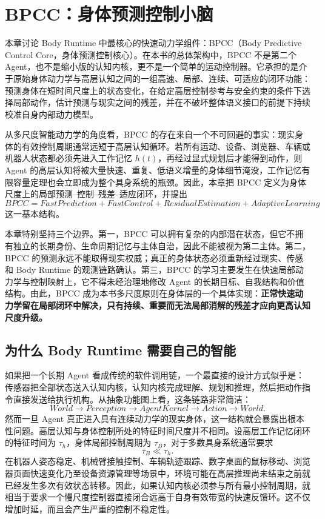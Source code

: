 \chapter{BPCC：身体预测控制小脑}

\begin{chapterlead}
本章讨论 Body Runtime 中最核心的快速动力学组件：BPCC（Body Predictive Control Core，身体预测控制核心）。在本书的总体架构中，BPCC 不是第二个 Agent，也不是缩小版的认知内核，更不是一个简单的运动控制器。它承担的是介于原始身体动力学与高层认知之间的一组高速、局部、连续、可适应的闭环功能：预测身体在短时间尺度上的状态变化，在给定高层控制参考与安全约束的条件下选择局部动作，估计预测与现实之间的残差，并在不破坏整体语义接口的前提下持续校准自身内部动力模型。

从多尺度智能动力学的角度看，BPCC 的存在来自一个不可回避的事实：现实身体的有效控制周期通常远短于高层认知循环。若所有运动、设备、浏览器、车辆或机器人状态都必须先进入工作记忆 $h(t)$，再经过显式规划后才能得到动作，则 Agent 的高层认知将被大量快速、重复、低语义增量的身体细节淹没，工作记忆有限容量定理也会立即成为整个具身系统的瓶颈。因此，本章把 BPCC 定义为身体尺度上的局部预测--控制--残差--适应闭环，并提出
\[
\boxed{
BPCC
=
FastPrediction
+
FastControl
+
ResidualEstimation
+
AdaptiveLearning
}
\]
这一基本结构。

本章特别坚持三个边界。第一，BPCC 可以拥有复杂的内部潜在状态，但它不拥有独立的长期身份、生命周期记忆与主体自治，因此不能被视为第二主体。第二，BPCC 的预测永远不能取得现实权威；真正的身体状态必须重新经过现实、传感和 Body Runtime 的观测链路确认。第三，BPCC 的学习主要发生在快速局部动力学与控制映射上，它不得未经治理地修改 Agent 的长期目标、自我结构和价值结构。由此，BPCC 成为本书多尺度原则在身体层的一个具体实现：\textbf{正常快速动力学留在局部闭环中解决，只有持续、重要而无法局部消解的残差才应向更高认知尺度升级。}
\end{chapterlead}


\section{为什么 Body Runtime 需要自己的智能}

如果把一个长期 Agent 看成传统的软件调用链，一个最直接的设计方式似乎是：传感器把全部状态送入认知内核，认知内核完成理解、规划和推理，然后把动作指令直接发送给执行机构。从抽象功能图上看，这条链路非常简洁：
\[
World
\rightarrow
Perception
\rightarrow
AgentKernel
\rightarrow
Action
\rightarrow
World.
\]
然而一旦 Agent 真正进入具有连续动力学的现实身体，这一结构就会暴露出根本性问题。高层认知与身体控制所处的特征时间尺度并不相同。设高层工作记忆闭环的特征时间为 $\tau_h$，身体局部控制周期为 $\tau_B$，对于多数具身系统通常要求
\[
\tau_B \ll \tau_h.
\]
在机器人姿态稳定、机械臂接触控制、车辆轨迹跟踪、数字桌面的鼠标移动、浏览器页面快速变化乃至设备资源管理等场景中，环境可能在高层推理尚未结束之前就已经发生多次有效状态转移。因此，如果认知内核必须参与所有最小控制周期，就相当于要求一个慢尺度控制器直接闭合远高于自身有效带宽的快速反馈环。这不仅增加时延，而且会产生严重的控制不稳定性。


